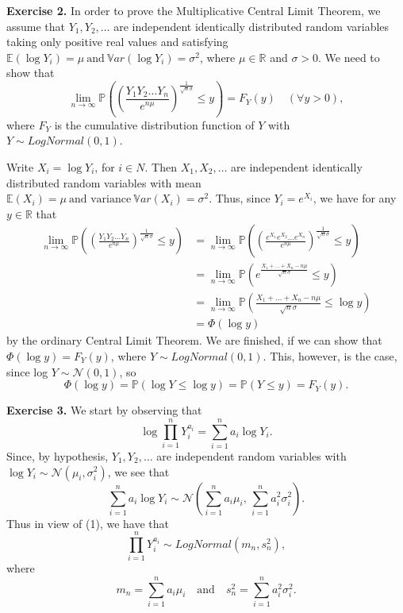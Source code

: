 \documentclass[11pt,a4paper]{report}
\begin{document}
\textbf{Exercise 2.} In order to prove the Multiplicative Central Limit Theorem, we assume that $Y_1, Y_2, \ldots$ are independent identically distributed random variables taking only positive real values and satisfying $\mathbb{E}(\log Y_i) = \mu \ \text{and}\ \mathbb{V}ar(\log Y_i) = \sigma^2$, where $\mu \in \mathbb{R}$ and $\sigma > 0$. We need to show that $$\lim_{n\to\infty}\mathbb{P}\left(\left(\frac{Y_1Y_2\ldots Y_n}{e^{n\mu}}\right)^{\frac{1}{\sqrt{n}\sigma}}\leq y\right) = F_Y(y)\quad (\forall y > 0),$$ where $F_Y$ is the cumulative distribution function of $Y$ with $Y \sim LogNormal(0, 1)$.\par
Write $X_i = \log Y_i$, for $i \in N$. Then $X_1, X_2,\ldots$ are independent identically distributed random variables with mean $\mathbb{E}(X_i) = \mu \ \text{and variance}\  \mathbb{V}ar(X_i) = \sigma^2$. Thus, since $Y_i = e^{X_i}$, we have for any $y \in \mathbb{R}$ that
\begin{align*}
    \lim_{n\to\infty}\mathbb{P}\left(\left(\frac{Y_1Y_2\ldots Y_n}{e^{n\mu}}\right)^{\frac{1}{\sqrt{n}\sigma}}\leq y\right) &= \lim_{n\to \infty}\mathbb{P}\left(\left(\frac{e^{X_1}e^{X_2}\ldots e^{X_n}}{e^{n\mu}}\right)^{\frac{1}{\sqrt{n}\sigma}} \leq y\right)\\
    &= \lim_{n\to\infty}\mathbb{P}\left(e^{\frac{X_1+\ldots +X_n-n\mu}{\sqrt{n}\sigma}}\leq y\right)\\
    &= \lim_{n\to\infty}\mathbb{P}\left(\frac{X_1+\ldots +X_n-n\mu}{\sqrt{n}\sigma}\leq \log y\right)\\
    &= \Phi(\log y)
\end{align*}
by the ordinary Central Limit Theorem. We are finished, if we can show that $\Phi(\log y) = F_Y (y)$, where $Y \sim LogNormal(0, 1)$. This, however, is the case, since log $Y \sim \mathcal{N}(0, 1)$, so $$\Phi(\log y) = \mathbb{P}(\log Y \leq \log y) = \mathbb{P}(Y \leq y) = F_Y(y).$$\par
\textbf{Exercise 3.} We start by observing that $$\log \prod_{i=1}^nY_i^{a_i}=\sum_{i=1}^na_i\log Y_i.$$ Since, by hypothesis, $Y_1, Y_2, \ldots$ are independent random variables with $\log Y_i \sim\mathcal{N}(\mu_i,\sigma_i^2)$, we see that $$\sum_{i=1}^na_i\log Y_i\sim\mathcal{N}\left(\sum_{i=1}^na_i\mu_i,\,\sum_{i=1}^na_i^2\sigma_i^2\right).$$ Thus in view of (1), we have that $$\prod_{i=1}^nY_i^{a_i}\sim LogNormal(m_n,s_n^2),$$ where $$m_n=\sum_{i=1}^na_i\mu_i \quad \text{and} \quad s_n^2=\sum_{i=1}^na_i^2\sigma_i^2.$$
\end{document}
